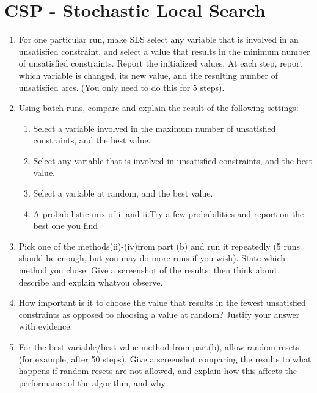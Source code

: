\documentclass{article}
\def\ans#1{{\color{ans}#1}}
\begin{document}
\clearpage
\section{CSP - Stochastic Local Search}
\begin{enumerate}[label=(\alph*)]
    \item For one particular run, make SLS select any variable that is involved in an unsatisfied constraint, and select a value that results in the minimum number of unsatisfied constraints. Report the initialized values.  At each step, report which variable is changed, its new value, and the resulting number of unsatisfied arcs. (You only need to do this for 5 steps).
    \ans{
    }
    \item Using batch runs, compare and explain the result of the following settings:
    \begin{enumerate}[label=(\roman*)]
        \item Select a variable involved in the maximum number of unsatisfied constraints, and the best value.
        \ans{
        }
        \item Select any variable that is involved in unsatisfied constraints, and the best value.
        \ans{
        }
        \item Select a variable at random, and the best value.
        \ans{
        }
        \item A probabilistic mix of i. and ii.Try a few probabilities and report on the best one you find
        \ans{
        }
    \end{enumerate}
    \item Pick one of the methods(ii)-(iv)from part (b) and run it repeatedly (5 runs should be enough, but you may do more runs if you wish). State which method you chose. Give a screenshot of the results; then think about, describe and explain whatyou observe.
    \ans{
    }
    \item How important is it to choose the value that results in the fewest unsatisfied constraints as opposed to choosing a value at random? Justify your answer with evidence.
    \ans{
    }
    \item For the best variable/best value method from part(b), allow random resets (for example, after 50 steps). Give a screenshot comparing the results to what happens if random resets are not allowed, and explain how this affects the performance of the algorithm, and why.
    \ans{
    }
\end{enumerate}
\end{document}
